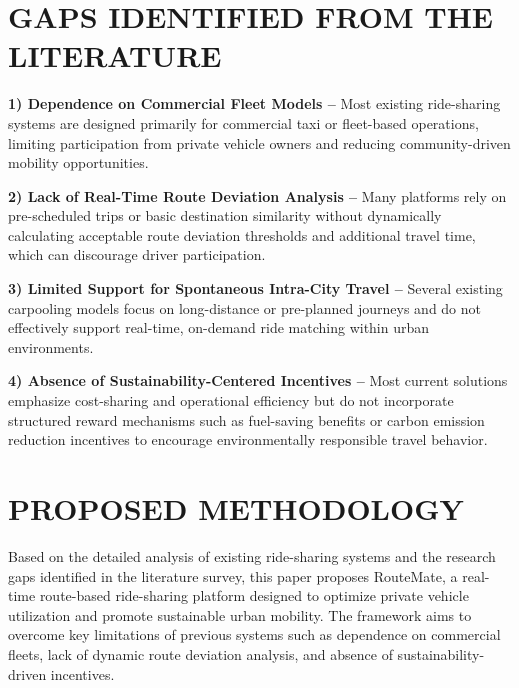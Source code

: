 \documentclass[conference]{IEEEtran}
\begin{document}
\section{GAPS IDENTIFIED FROM THE LITERATURE}

\textbf{1) Dependence on Commercial Fleet Models –} Most existing ride-sharing systems are designed primarily for commercial taxi or fleet-based operations, limiting participation from private vehicle owners and reducing community-driven mobility opportunities.

\vspace{4pt}

\textbf{2) Lack of Real-Time Route Deviation Analysis –} Many platforms rely on pre-scheduled trips or basic destination similarity without dynamically calculating acceptable route deviation thresholds and additional travel time, which can discourage driver participation.

\vspace{4pt}

\textbf{3) Limited Support for Spontaneous Intra-City Travel –} Several existing carpooling models focus on long-distance or pre-planned journeys and do not effectively support real-time, on-demand ride matching within urban environments.

\vspace{4pt}

\textbf{4) Absence of Sustainability-Centered Incentives –} Most current solutions emphasize cost-sharing and operational efficiency but do not incorporate structured reward mechanisms such as fuel-saving benefits or carbon emission reduction incentives to encourage environmentally responsible travel behavior.

\section{PROPOSED METHODOLOGY}


Based on the detailed analysis of existing ride-sharing systems and the research gaps identified in the literature survey, this paper proposes RouteMate, a real-time route-based ride-sharing platform designed to optimize private vehicle utilization and promote sustainable urban mobility. The framework aims to overcome key limitations of previous systems such as dependence on commercial fleets, lack of dynamic route deviation analysis, and absence of sustainability-driven incentives.
\end{document}
